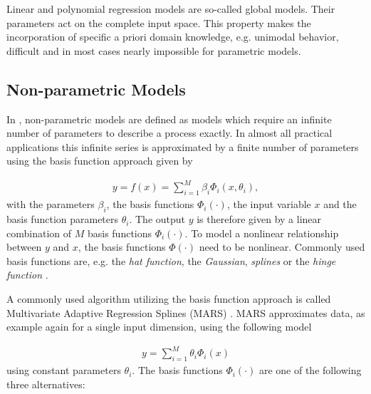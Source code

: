 Linear and polynomial regression models are so-called global models. Their parameters act on the complete input space. This property makes the incorporation of specific a priori domain knowledge, e.g. unimodal behavior, difficult and in most cases nearly impossible for parametric models. 

\subsection{Non-parametric Models}

In \cite{nelles2013nonlinear}, non-parametric models are defined as models which require an infinite number of parameters to describe a process exactly. In almost all practical applications this infinite series is approximated by a finite number of parameters using the basis function approach given by

\begin{align} \label{eq:basis-function-approach}
	y = f(x) = \sum_{i=1}^M \beta_i \Phi_i(x, \theta_i),
\end{align} 
%
with the parameters $\beta_i$, the basis functions $\Phi_i(\cdot)$, the input variable $x$ and the basis function parameters $\theta_i$. The output $y$ is therefore given by a linear combination of $M$ basis functions $\Phi_i(\cdot)$. To model a nonlinear relationship between $y$ and $x$, the basis functions $\Phi(\cdot)$ need to be nonlinear. Commonly used basis functions are, e.g. the \emph{hat function}, the \emph{Gaussian}, \emph{splines} or the \emph{hinge function} \cite{friedman2001elements}. 

A commonly used algorithm utilizing the basis function approach is called Multivariate Adaptive Regression Splines (MARS) \cite{friedman1991multivariate}. MARS approximates data, as example again for a single input dimension, using the following model

\begin{align} \label{eq:MARS}
	y = \sum_{i=1}^M \theta_i \Phi_i(x)
\end{align}
%
using constant parameters $\theta_i$. The basis functions $\Phi_i(\cdot)$ are one of the following three alternatives:

